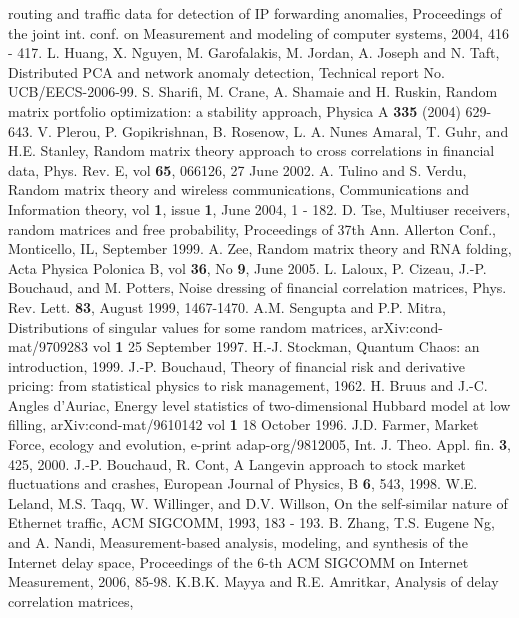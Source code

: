 \documentclass{IEEEtran}
\begin{document}
\begin{thebibliography}{10}
routing and traffic data for detection of IP forwarding anomalies,
Proceedings of the joint int. conf. on Measurement and modeling of
computer systems, 2004, 416 - 417.
L. Huang, X. Nguyen, M. Garofalakis, M. Jordan, A. Joseph and N. Taft,
Distributed PCA and network anomaly detection, Technical report No.
UCB/EECS-2006-99.
S. Sharifi, M. Crane, A. Shamaie and H. Ruskin, Random matrix portfolio
optimization: a stability approach, Physica A \textbf{335} (2004)
629-643.
V. Plerou, P. Gopikrishnan, B. Rosenow, L. A. Nunes Amaral, T. Guhr,
and H.E. Stanley, Random matrix theory approach to cross correlations
in financial data, Phys. Rev. E, vol \textbf{65}, 066126, 27 June
2002.
A. Tulino and S. Verdu, Random matrix theory and wireless communications,
Communications and Information theory, vol \textbf{1}, issue \textbf{1},
June 2004, 1 - 182.
D. Tse, Multiuser receivers, random matrices and free probability,
Proceedings of 37th Ann. Allerton Conf., Monticello, IL, September
1999.
A. Zee, Random matrix theory and RNA folding, Acta Physica Polonica
B, vol \textbf{36}, No \textbf{9}, June 2005.
L. Laloux, P. Cizeau, J.-P. Bouchaud, and M. Potters, Noise dressing
of financial correlation matrices, Phys. Rev. Lett. \textbf{83}, August
1999, 1467-1470.
A.M. Sengupta and P.P. Mitra, Distributions of singular values for
some random matrices, arXiv:cond-mat/9709283 vol \textbf{1} 25 September
1997.
H.-J. Stockman, Quantum Chaos: an introduction, 1999.
J.-P. Bouchaud, Theory of financial risk and derivative pricing: from
statistical physics to risk management, 1962.
H. Bruus and J.-C. Angles d'Auriac, Energy level statistics of two-dimensional
Hubbard model at low filling, arXiv:cond-mat/9610142 vol \textbf{1}
18 October 1996.
J.D. Farmer, Market Force, ecology and evolution, e-print adap-org/9812005,
Int. J. Theo. Appl. fin. \textbf{3}, 425, 2000.
J.-P. Bouchaud, R. Cont, A Langevin approach to stock market fluctuations
and crashes, European Journal of Physics, B \textbf{6}, 543, 1998.
W.E. Leland, M.S. Taqq, W. Willinger, and D.V. Willson, On the self-similar
nature of Ethernet traffic, ACM SIGCOMM, 1993, 183 - 193.
B. Zhang, T.S. Eugene Ng, and A. Nandi, Measurement-based analysis,
modeling, and synthesis of the Internet delay space, Proceedings of
the 6-th ACM SIGCOMM on Internet Measurement, 2006, 85-98. 
K.B.K. Mayya and R.E. Amritkar, Analysis of delay correlation matrices,

\end{thebibliography}
\end{document}
